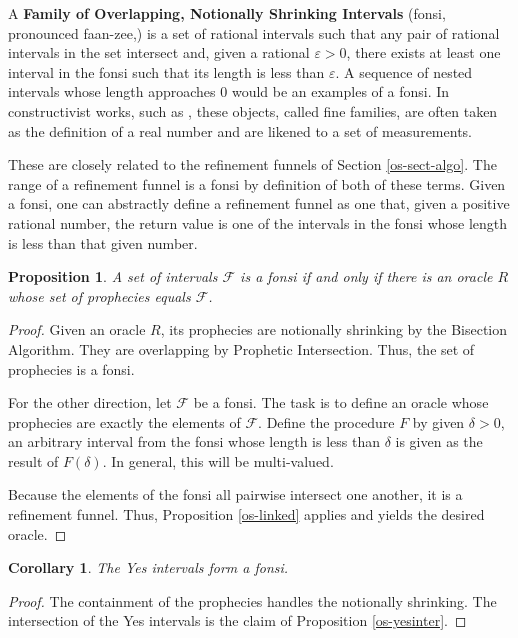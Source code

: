 \documentclass[12pt]{article}
\newtheorem{corollary}{Corollary}[section]
\newtheorem{proposition}{Proposition}[section]
\begin{document}
 A \textbf{Family of Overlapping, Notionally Shrinking Intervals} (fonsi, pronounced faan-zee,) is a set of rational intervals such that any pair of rational intervals in the set intersect and, given a rational $\varepsilon >0$, there exists at least one interval in the fonsi such that its length is less than $\varepsilon$. A sequence of nested intervals whose length approaches $0$ would be an  examples of a fonsi. In constructivist works, such as \cite{bridger}, these objects, called fine families, are often taken as the definition of a real number and are likened to a set of measurements. 

These are closely related to the refinement funnels of Section \ref{os-sect-algo}. The range of a refinement funnel is a fonsi by definition of both of these terms. Given a fonsi, one can abstractly define a refinement funnel as one that, given a positive rational number, the return value is one of the intervals in the fonsi whose length is less than that given number.

\begin{proposition}
    A set of intervals $\mathcal{F}$ is a fonsi if and only if there is an oracle $R$ whose set of prophecies equals $\mathcal{F}$.
\end{proposition}

\begin{proof}
    Given an oracle $R$, its prophecies are notionally shrinking by the Bisection Algorithm. They are overlapping by Prophetic Intersection. Thus, the set of prophecies is a fonsi. 

    For the other direction, let $\mathcal{F}$ be a fonsi. The task is to define an oracle whose prophecies are exactly the elements of $\mathcal{F}$. Define the procedure $F$ by given $\delta >0$, an arbitrary interval from the fonsi whose length is less than $\delta$ is given as the result of $F(\delta)$. In general, this will be multi-valued. 

    Because the elements of the fonsi all pairwise intersect one another, it is a refinement funnel. Thus, Proposition \ref{os-linked} applies and yields the desired oracle. 
\end{proof}

\begin{corollary}
    The Yes intervals form a fonsi. 
\end{corollary}

\begin{proof}
    The containment of the prophecies handles the notionally shrinking. The intersection of the Yes intervals is the claim of Proposition \ref{os-yesinter}.
\end{proof}
\end{document}
